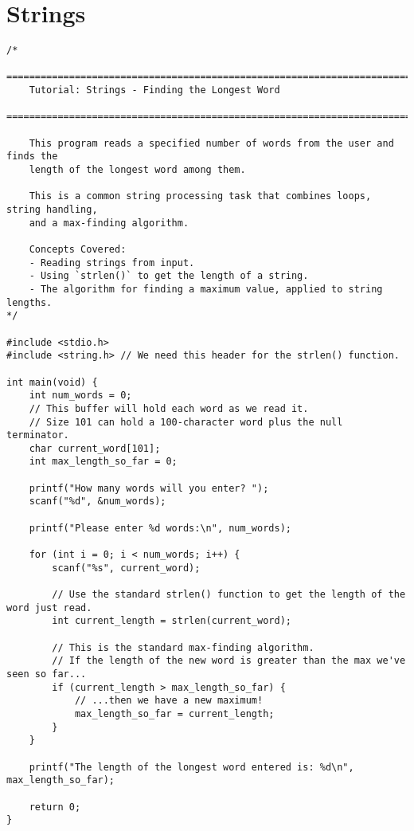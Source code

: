 \documentclass[11pt]{book}
\begin{document}
\chapter{Strings}
\clearpage
\begin{verbatim}
/*
    ================================================================================
    Tutorial: Strings - Finding the Longest Word
    ================================================================================

    This program reads a specified number of words from the user and finds the
    length of the longest word among them.

    This is a common string processing task that combines loops, string handling,
    and a max-finding algorithm.

    Concepts Covered:
    - Reading strings from input.
    - Using `strlen()` to get the length of a string.
    - The algorithm for finding a maximum value, applied to string lengths.
*/

#include <stdio.h>
#include <string.h> // We need this header for the strlen() function.

int main(void) {
    int num_words = 0;
    // This buffer will hold each word as we read it.
    // Size 101 can hold a 100-character word plus the null terminator.
    char current_word[101];
    int max_length_so_far = 0;

    printf("How many words will you enter? ");
    scanf("%d", &num_words);

    printf("Please enter %d words:\n", num_words);

    for (int i = 0; i < num_words; i++) {
        scanf("%s", current_word);

        // Use the standard strlen() function to get the length of the word just read.
        int current_length = strlen(current_word);

        // This is the standard max-finding algorithm.
        // If the length of the new word is greater than the max we've seen so far...
        if (current_length > max_length_so_far) {
            // ...then we have a new maximum!
            max_length_so_far = current_length;
        }
    }

    printf("The length of the longest word entered is: %d\n", max_length_so_far);

    return 0;
}


\end{verbatim}
\end{document}
